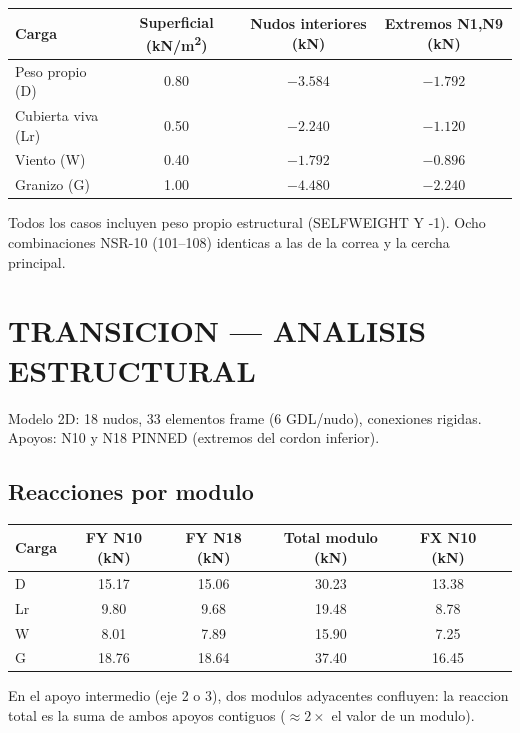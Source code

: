 \documentclass[12pt,a4paper]{article}
\newcommand{\tableheadrow}{\rowcolor{primary!15}\sffamily\footnotesize\bfseries\color{primary}}
\begin{document}
\begin{center}
\begin{tabular}{l c c c}
\toprule
\tableheadrow
\textbf{Carga} & \textbf{Superficial (kN/m\textsuperscript{2})} & \textbf{Nudos interiores (kN)} & \textbf{Extremos N1,N9 (kN)} \\
\midrule
Peso propio (D)  & 0.80 & $-3.584$ & $-1.792$ \\
Cubierta viva (Lr) & 0.50 & $-2.240$ & $-1.120$ \\
\rowcolor{tablerow}
Viento (W) & 0.40 & $-1.792$ & $-0.896$ \\
Granizo (G) & 1.00 & $-4.480$ & $-2.240$ \\
\bottomrule
\end{tabular}
\end{center}

Todos los casos incluyen peso propio estructural (SELFWEIGHT Y -1).
Ocho combinaciones NSR-10 (101--108) identicas a las de la correa y la cercha principal.

\section{TRANSICION --- ANALISIS ESTRUCTURAL}
Modelo 2D: 18 nudos, 33 elementos frame (6 GDL/nudo), conexiones rigidas.
Apoyos: N10 y N18 PINNED (extremos del cordon inferior).

\subsection{Reacciones por modulo}
\begin{center}
\begin{tabular}{l c c c c c}
\toprule
\tableheadrow
\textbf{Carga} & \textbf{FY N10 (kN)} & \textbf{FY N18 (kN)} & \textbf{Total modulo (kN)} & \textbf{FX N10 (kN)} \\
\midrule
D  & 15.17 & 15.06 & 30.23 & 13.38 \\
Lr &  9.80 &  9.68 & 19.48 &  8.78 \\
\rowcolor{tablerow}
W  &  8.01 &  7.89 & 15.90 &  7.25 \\
G  & 18.76 & 18.64 & 37.40 & 16.45 \\
\bottomrule
\end{tabular}
\end{center}

En el apoyo intermedio (eje 2 o 3), dos modulos adyacentes confluyen:
la reaccion total es la suma de ambos apoyos contiguos
($\approx 2 \times$ el valor de un modulo).
\end{document}
